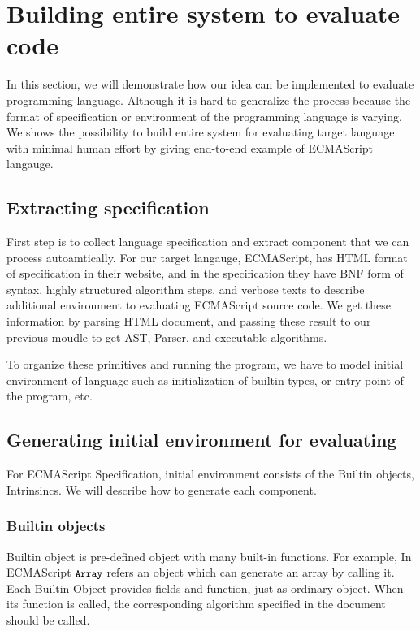 \section{Building entire system to evaluate code}

In this section, we will demonstrate how our idea can be implemented to evaluate programming language. Although it is hard to generalize the process because the format of specification or 
environment of the programming language is varying, We shows the possibility to build entire system for evaluating target language with minimal human effort by giving end-to-end example of ECMAScript langauge.

\subsection{Extracting specification}
First step is to collect language specification and extract component that we can process autoamtically. For our target langauge, ECMAScript, has HTML format of specification in their website, and
in the specification they have BNF form of syntax, highly structured algorithm steps, and verbose texts to describe additional environment to evaluating ECMAScript source code.
We get these information by parsing HTML document, and passing these result to our previous moudle to get AST, Parser, and executable algorithms.

To organize these primitives and running the program, we have to model initial environment of language such as initialization of builtin types, or entry point of the program, etc.

\subsection{Generating initial environment for evaluating}
For ECMAScript Specification, initial environment consists of the Builtin objects, Intrinsincs. We will describe how to generate each component.

\subsubsection{Builtin objects}

 Builtin object is pre-defined object with many built-in functions. For example, In ECMAScript \( \texttt{\small Array} \) refers an object which can generate an array by
 calling it. Each Builtin Object provides fields and function, just as ordinary object. When its function is called,
 the corresponding algorithm specified in the document should be called. 
 
